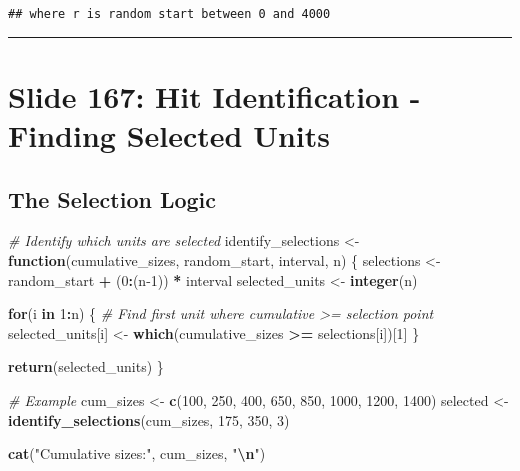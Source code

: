 \documentclass[
]{article}
\newenvironment{Shaded}{\begin{snugshade}}{\end{snugshade}}
\newcommand{\CommentTok}[1]{\textcolor[rgb]{0.56,0.35,0.01}{\textit{#1}}}
\newcommand{\ControlFlowTok}[1]{\textcolor[rgb]{0.13,0.29,0.53}{\textbf{#1}}}
\newcommand{\DecValTok}[1]{\textcolor[rgb]{0.00,0.00,0.81}{#1}}
\newcommand{\FunctionTok}[1]{\textcolor[rgb]{0.13,0.29,0.53}{\textbf{#1}}}
\newcommand{\NormalTok}[1]{#1}
\newcommand{\OtherTok}[1]{\textcolor[rgb]{0.56,0.35,0.01}{#1}}
\newcommand{\SpecialCharTok}[1]{\textcolor[rgb]{0.81,0.36,0.00}{\textbf{#1}}}
\newcommand{\StringTok}[1]{\textcolor[rgb]{0.31,0.60,0.02}{#1}}
\begin{document}
\begin{verbatim}
## where r is random start between 0 and 4000
\end{verbatim}

\begin{center}\rule{0.5\linewidth}{0.5pt}\end{center}

\section{Slide 167: Hit Identification - Finding Selected
Units}\label{slide-167-hit-identification---finding-selected-units}

\subsection{The Selection Logic}\label{the-selection-logic}

\begin{Shaded}
\begin{Highlighting}[]
\CommentTok{\# Identify which units are selected}
\NormalTok{identify\_selections }\OtherTok{\textless{}{-}} \ControlFlowTok{function}\NormalTok{(cumulative\_sizes, random\_start, interval, n) \{}
\NormalTok{  selections }\OtherTok{\textless{}{-}}\NormalTok{ random\_start }\SpecialCharTok{+}\NormalTok{ (}\DecValTok{0}\SpecialCharTok{:}\NormalTok{(n}\DecValTok{{-}1}\NormalTok{)) }\SpecialCharTok{*}\NormalTok{ interval}
\NormalTok{  selected\_units }\OtherTok{\textless{}{-}} \FunctionTok{integer}\NormalTok{(n)}
  
  \ControlFlowTok{for}\NormalTok{(i }\ControlFlowTok{in} \DecValTok{1}\SpecialCharTok{:}\NormalTok{n) \{}
    \CommentTok{\# Find first unit where cumulative \textgreater{}= selection point}
\NormalTok{    selected\_units[i] }\OtherTok{\textless{}{-}} \FunctionTok{which}\NormalTok{(cumulative\_sizes }\SpecialCharTok{\textgreater{}=}\NormalTok{ selections[i])[}\DecValTok{1}\NormalTok{]}
\NormalTok{  \}}
  
  \FunctionTok{return}\NormalTok{(selected\_units)}
\NormalTok{\}}

\CommentTok{\# Example}
\NormalTok{cum\_sizes }\OtherTok{\textless{}{-}} \FunctionTok{c}\NormalTok{(}\DecValTok{100}\NormalTok{, }\DecValTok{250}\NormalTok{, }\DecValTok{400}\NormalTok{, }\DecValTok{650}\NormalTok{, }\DecValTok{850}\NormalTok{, }\DecValTok{1000}\NormalTok{, }\DecValTok{1200}\NormalTok{, }\DecValTok{1400}\NormalTok{)}
\NormalTok{selected }\OtherTok{\textless{}{-}} \FunctionTok{identify\_selections}\NormalTok{(cum\_sizes, }\DecValTok{175}\NormalTok{, }\DecValTok{350}\NormalTok{, }\DecValTok{3}\NormalTok{)}

\FunctionTok{cat}\NormalTok{(}\StringTok{"Cumulative sizes:"}\NormalTok{, cum\_sizes, }\StringTok{"}\SpecialCharTok{\textbackslash{}n}\StringTok{"}\NormalTok{)}
\end{Highlighting}
\end{Shaded}
\end{document}
